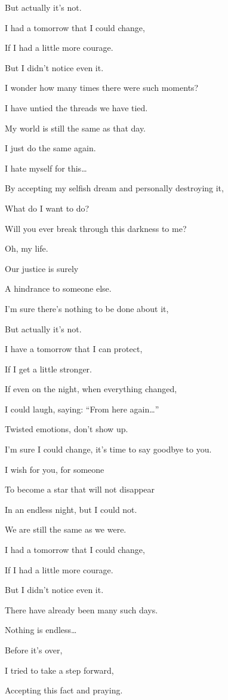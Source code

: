 \documentclass[
  letterpaper,
  DIV=11,
  numbers=noendperiod]{scrreprt}
\begin{document}
But actually it's not.

I had a tomorrow that I could change,

If I had a little more courage.

But I didn't notice even it.

I wonder how many times there were such moments?

I have untied the threads we have tied.

My world is still the same as that day.

I just do the same again.

I hate myself for this\ldots{}

By accepting my selfish dream and personally destroying it,

What do I want to do?

Will you ever break through this darkness to me?

Oh, my life.

Our justice is surely

A hindrance to someone else.

I'm sure there's nothing to be done about it,

But actually it's not.

I have a tomorrow that I can protect,

If I get a little stronger.

If even on the night, when everything changed,

I could laugh, saying: ``From here again\ldots{}''

Twisted emotions, don't show up.

I'm sure I could change, it's time to say goodbye to you.

I wish for you, for someone

To become a star that will not disappear

In an endless night, but I could not.

We are still the same as we were.

I had a tomorrow that I could change,

If I had a little more courage.

But I didn't notice even it.

There have already been many such days.

Nothing is endless\ldots{}

Before it's over,

I tried to take a step forward,

Accepting this fact and praying.
\end{document}
